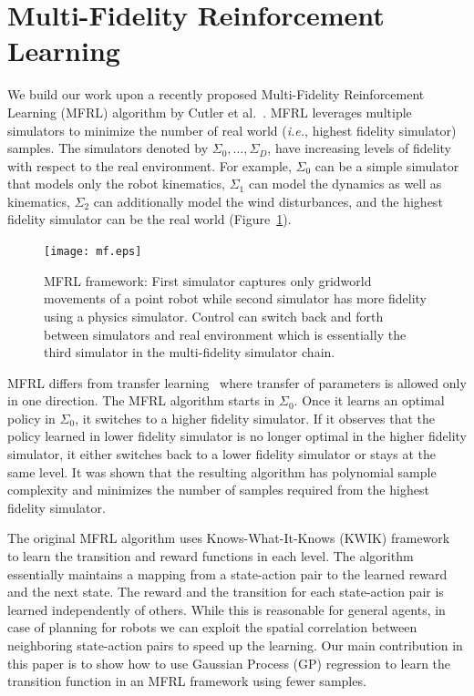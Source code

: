 \documentclass[12pt]{report}
\newcommand{\ie}{\textit{i.e.}}
\begin{document}
\label{gpMfrl} %
\section{Multi-Fidelity Reinforcement Learning}
We build our work upon a recently proposed Multi-Fidelity Reinforcement Learning (MFRL) algorithm by Cutler et al.~\cite{cutler2014reinforcement}. MFRL leverages multiple simulators to minimize the number of real world (\ie, highest fidelity simulator) samples. The simulators denoted by $\Sigma_0,\ldots,\Sigma_D$, have increasing levels of fidelity with respect to the real environment. For example, $\Sigma_0$ can be a simple simulator that models only the robot kinematics, $\Sigma_1$ can model the dynamics as well as kinematics, $\Sigma_2$ can additionally model the wind disturbances, and the highest fidelity simulator can be the real world (Figure~\ref{fig:mfrl_architecture}). 

\begin{figure}[htp]
	\centering
	\texttt{[image: mf.eps]}
	\caption {MFRL framework: First simulator captures only gridworld movements of a point robot while second simulator has more fidelity using a physics simulator. Control can switch back and forth between simulators and real environment which is essentially the third simulator in the multi-fidelity simulator chain.}
   \label{fig:mfrl_architecture}
\end{figure}

MFRL differs from transfer learning~\cite{taylor2007transfer} where transfer of parameters is allowed only in one direction. The MFRL algorithm starts in $\Sigma_0$. Once it learns an optimal policy in $\Sigma_0$, it switches to a higher fidelity simulator. If it observes that the policy learned in lower fidelity simulator is no longer optimal in the higher fidelity simulator, it either switches back to a lower fidelity simulator or stays at the same level. It was shown that the resulting algorithm has polynomial sample complexity and minimizes the number of samples required from the highest fidelity simulator. 

The original MFRL algorithm uses Knows-What-It-Knows (KWIK) framework~\cite{li2011knows} to learn the transition and reward functions in each level. The algorithm essentially maintains a mapping from a state-action pair to the learned reward and the next state. The reward and the transition for each state-action pair is learned independently of others. While this is reasonable for general agents, in case of planning for robots we can exploit the spatial correlation between neighboring state-action pairs to speed up the learning. Our main contribution in this paper is to show how to use Gaussian Process (GP) regression to learn the transition function in an MFRL framework using fewer samples. 
\end{document}
